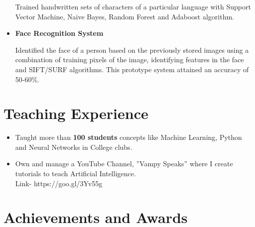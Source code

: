 \documentclass[11pt,a4paper,sans]{moderncv}        %
\begin{document}
\begin{itemize}
{\vspace{2pt}

\small{Trained handwritten sets of characters of a particular language with Support Vector Machine, Naive Bayes, Random Forest and Adaboost algorithm.}}
\vspace{3pt}

\item{\textbf{Face Recognition System} 

\vspace{2pt}

\small{Identified the face of a person based on the previously stored images using a combination of training pixels of the image, identifying features in the face and SIFT/SURF algorithms. This prototype system attained an accuracy of 50-60\%.}}

\vspace{3pt}



\end{itemize}

\section{Teaching Experience}
\vspace{3pt}
\begin{itemize}
\item{Taught more than \textbf{100 students} concepts like Machine Learning, Python and Neural Networks in College clubs.}
\vspace{3pt}
\item{Own and manage a YouTube Channel, ”Vampy Speaks” where I create tutorials to teach Artificial Intelligence. \\ Link- https://goo.gl/3Yv55g}
\end{itemize}

\section{Achievements and Awards}

\vspace{3pt}
\end{document}
